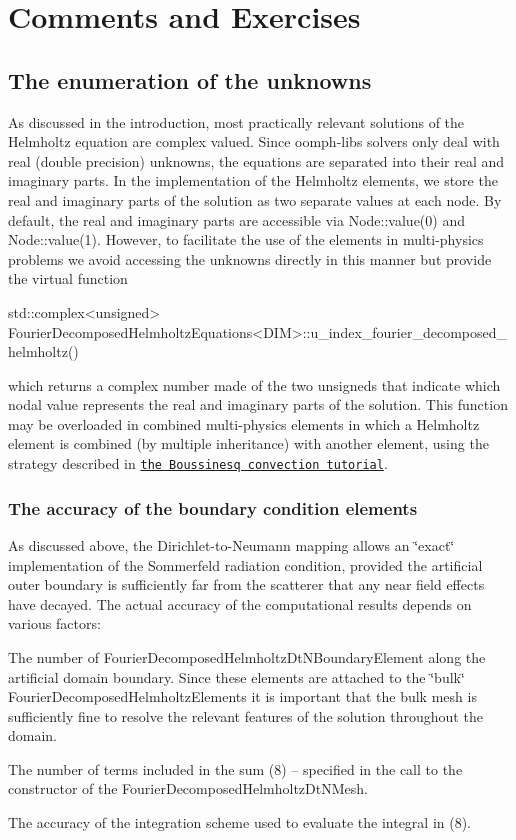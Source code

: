 \hypertarget{index_comm_ex}{}\section{Comments and Exercises}\label{index_comm_ex}
\hypertarget{index_numbering}{}\subsection{The enumeration of the unknowns}\label{index_numbering}
As discussed in the introduction, most practically relevant solutions of the Helmholtz equation are complex valued. Since {\ttfamily oomph-\/lib\textquotesingle{}s} solvers only deal with real (double precision) unknowns, the equations are separated into their real and imaginary parts. In the implementation of the Helmholtz elements, we store the real and imaginary parts of the solution as two separate values at each node. By default, the real and imaginary parts are accessible via {\ttfamily Node\+::value(0)} and {\ttfamily Node\+::value(1)}. However, to facilitate the use of the elements in multi-\/physics problems we avoid accessing the unknowns directly in this manner but provide the virtual function 
\begin{DoxyCode}
std::complex<unsigned> FourierDecomposedHelmholtzEquations<DIM>::u\_index\_fourier\_decomposed\_helmholtz()
\end{DoxyCode}
 which returns a complex number made of the two unsigneds that indicate which nodal value represents the real and imaginary parts of the solution. This function may be overloaded in combined multi-\/physics elements in which a Helmholtz element is combined (by multiple inheritance) with another element, using the strategy described in \href{../../../multi_physics/b_convection/html/index.html}{\tt the Boussinesq convection tutorial}.\hypertarget{index_acc}{}\subsubsection{The accuracy of the boundary condition elements}\label{index_acc}
As discussed above, the Dirichlet-\/to-\/\+Neumann mapping allows an \char`\"{}exact\char`\"{} implementation of the Sommerfeld radiation condition, provided the artificial outer boundary is sufficiently far from the scatterer that any near field effects have decayed. The actual accuracy of the computational results depends on various factors\+:
\begin{DoxyItemize}
\item The number of {\ttfamily Fourier\+Decomposed\+Helmholtz\+Dt\+N\+Boundary\+Element} along the artificial domain boundary. Since these elements are attached to the \char`\"{}bulk\char`\"{} {\ttfamily Fourier\+Decomposed\+Helmholtz\+Elements} it is important that the bulk mesh is sufficiently fine to resolve the relevant features of the solution throughout the domain.
\item The number of terms included in the sum (8) -- specified in the call to the constructor of the {\ttfamily Fourier\+Decomposed\+Helmholtz\+Dt\+N\+Mesh}.
\item The accuracy of the integration scheme used to evaluate the integral in (8).
\end{DoxyItemize}

